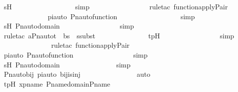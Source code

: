 \begin{isabellebody}
\ sH\ \isanewline
\ \ \ \ \ \ \ \ \ \ \ \ \ \ \ \isamarkupfalse%
\ simp\ \isanewline
\ \ \ \ \ \ \ \ \ \ \ \ \ \ \isamarkupfalse%
\ {\isacharparenleft}{\kern0pt}rule{\isacharunderscore}{\kern0pt}tac\ function{\isacharunderscore}{\kern0pt}apply{\isacharunderscore}{\kern0pt}Pair{\isacharparenright}{\kern0pt}\ \isanewline
\ \ \ \ \ \ \ \ \ \ \ \ \isamarkupfalse%
\ piauto\ Pn{\isacharunderscore}{\kern0pt}auto{\isacharunderscore}{\kern0pt}function\ \isanewline
\ \ \ \ \ \ \ \ \ \ \ \ \ \ \ \isamarkupfalse%
\ simp\ \isanewline
\ \ \ \ \ \ \ \ \ \ \ \ \isamarkupfalse%
\ sH\ Pn{\isacharunderscore}{\kern0pt}auto{\isacharunderscore}{\kern0pt}domain\ \isanewline
\ \ \ \ \ \ \ \ \ \ \ \ \ \ \isamarkupfalse%
\ simp\ \isanewline
\ \ \ \ \ \ \ \ \ \ \ \ \isamarkupfalse%
\ {\isacharparenleft}{\kern0pt}rule{\isacharunderscore}{\kern0pt}tac\ a{\isacharequal}{\kern0pt}{\isachardoublequoteopen}Pn{\isacharunderscore}{\kern0pt}auto{\isacharparenleft}{\kern0pt}{\isasympi}{\isacharparenright}{\kern0pt}{\isacharbackquote}{\kern0pt}t{\isachardoublequoteclose}\ \ b{\isacharequal}{\kern0pt}s{\isacharprime}{\kern0pt}\ \ ssubst{\isacharparenright}{\kern0pt}\ \isanewline
\ \ \ \ \ \ \ \ \ \ \ \ \isamarkupfalse%
\ tpH\ \isanewline
\ \ \ \ \ \ \ \ \ \ \ \ \ \ \isamarkupfalse%
\ simp\ \isanewline
\ \ \ \ \ \ \ \ \ \ \ \ \ \isamarkupfalse%
\ {\isacharparenleft}{\kern0pt}rule{\isacharunderscore}{\kern0pt}tac\ function{\isacharunderscore}{\kern0pt}apply{\isacharunderscore}{\kern0pt}Pair{\isacharparenright}{\kern0pt}\ \isanewline
\ \ \ \ \ \ \ \ \ \ \ \ \isamarkupfalse%
\ piauto\ Pn{\isacharunderscore}{\kern0pt}auto{\isacharunderscore}{\kern0pt}function\ \isanewline
\ \ \ \ \ \ \ \ \ \ \ \ \ \ \isamarkupfalse%
\ simp\ \isanewline
\ \ \ \ \ \ \ \ \ \ \ \ \isamarkupfalse%
\ sH\ Pn{\isacharunderscore}{\kern0pt}auto{\isacharunderscore}{\kern0pt}domain\ \isanewline
\ \ \ \ \ \ \ \ \ \ \ \ \ \isamarkupfalse%
\ simp\ \isanewline
\ \ \ \ \ \ \ \ \ \ \ \ \isamarkupfalse%
\ Pn{\isacharunderscore}{\kern0pt}auto{\isacharunderscore}{\kern0pt}bij\ piauto\ bij{\isacharunderscore}{\kern0pt}is{\isacharunderscore}{\kern0pt}inj\ \isanewline
\ \ \ \ \ \ \ \ \ \ \ \ \ \isamarkupfalse%
\ auto\ \isanewline
\ \ \ \ \ \ \ \ \ \ \ \ \isamarkupfalse%
\ tpH\ xpname\ P{\isacharunderscore}{\kern0pt}name{\isacharunderscore}{\kern0pt}domain{\isacharunderscore}{\kern0pt}P{\isacharunderscore}{\kern0pt}name\ \isanewline

\end{isabellebody}
